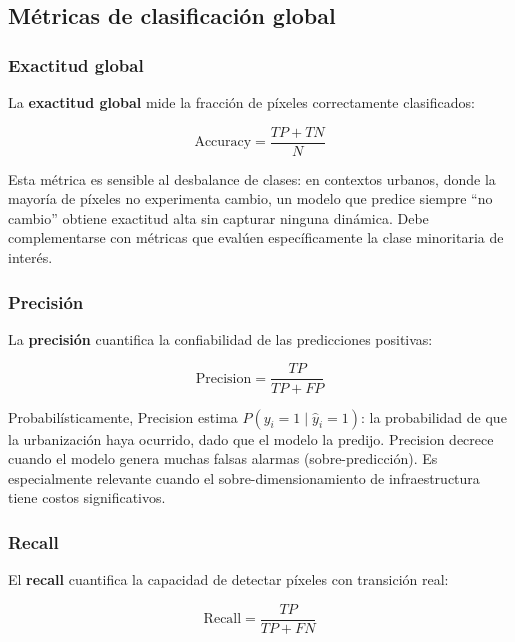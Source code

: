 \subsection{Métricas de clasificación global}

\subsubsection{Exactitud global}

La \textbf{exactitud global} mide la fracción de píxeles correctamente clasificados:

\begin{equation}
\text{Accuracy} = \frac{TP + TN}{N}
\label{eq:accuracy}
\end{equation}

Esta métrica es sensible al desbalance de clases: en contextos urbanos, donde la mayoría de píxeles no experimenta cambio, un modelo que predice siempre ``no cambio'' obtiene exactitud alta sin capturar ninguna dinámica. Debe complementarse con métricas que evalúen específicamente la clase minoritaria de interés.

\subsubsection{Precisión}

La \textbf{precisión} cuantifica la confiabilidad de las predicciones positivas:

\begin{equation}
\text{Precision} = \frac{TP}{TP + FP}
\label{eq:precision}
\end{equation}

Probabilísticamente, Precision estima $P(y_i = 1 \mid \hat{y}_i = 1)$: la probabilidad de que la urbanización haya ocurrido, dado que el modelo la predijo. Precision decrece cuando el modelo genera muchas falsas alarmas (sobre-predicción). Es especialmente relevante cuando el sobre-dimensionamiento de infraestructura tiene costos significativos.

\subsubsection{Recall}

El \textbf{recall} cuantifica la capacidad de detectar píxeles con transición real:

\begin{equation}
\text{Recall} = \frac{TP}{TP + FN}
\label{eq:recall}
\end{equation}

